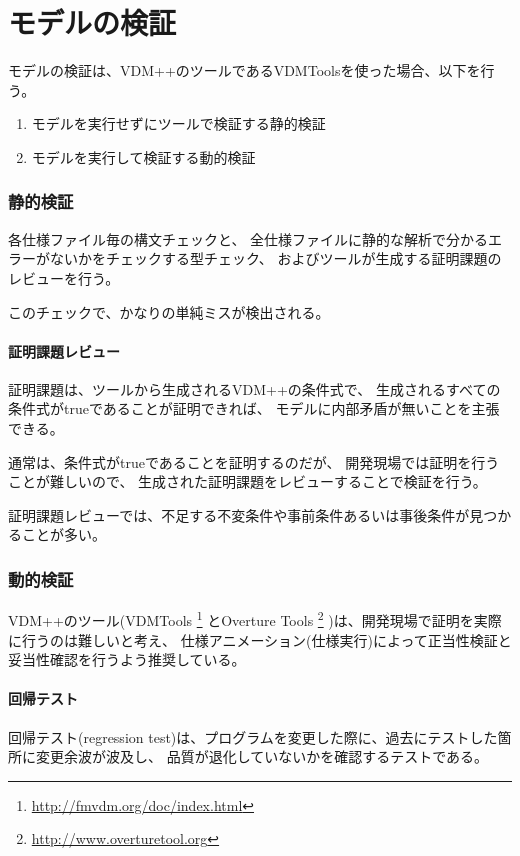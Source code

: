 \section {モデルの検証}
モデルの検証は、VDM++のツールであるVDMToolsを使った場合、以下を行う。

\begin{enumerate}
\item モデルを実行せずにツールで検証する静的検証
\item モデルを実行して検証する動的検証
\end{enumerate}

	\subsubsection {静的検証}
各仕様ファイル毎の構文チェックと、
全仕様ファイルに静的な解析で分かるエラーがないかをチェックする型チェック、
およびツールが生成する証明課題のレビューを行う。

このチェックで、かなりの単純ミスが検出される。

		\paragraph {証明課題レビュー}
証明課題は、ツールから生成されるVDM++の条件式で、
生成されるすべての条件式がtrueであることが証明できれば、
モデルに内部矛盾が無いことを主張できる。

通常は、条件式がtrueであることを証明するのだが、
開発現場では証明を行うことが難しいので、
生成された証明課題をレビューすることで検証を行う。

証明課題レビューでは、不足する不変条件や事前条件あるいは事後条件が見つかることが多い。

	\subsubsection {動的検証}
VDM++のツール(VDMTools
\footnote{\url{http://fmvdm.org/doc/index.html}}
とOverture Tools
\footnote{\url{http://www.overturetool.org}}
)は、開発現場で証明を実際に行うのは難しいと考え、
仕様アニメーション(仕様実行)によって正当性検証と妥当性確認を行うよう推奨している。

		\paragraph {回帰テスト}
		\label{sec:回帰テスト}
回帰テスト(regression test)は、プログラムを変更した際に、過去にテストした箇所に変更余波が波及し、
品質が退化していないかを確認するテストである。

